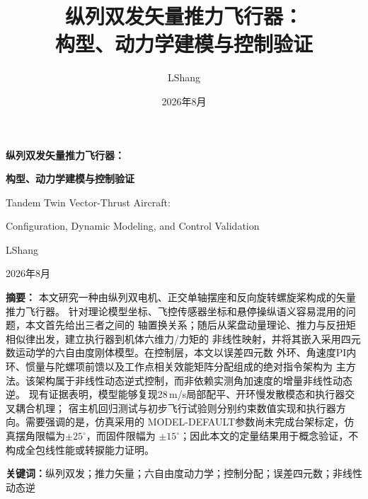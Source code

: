 


\title{\textbf{纵列双发矢量推力飞行器：\\构型、动力学建模与控制验证}}
\author{LShang}
\date{2026年8月}



\begin{titlepage}
\centering
{\bfseries 纵列双发矢量推力飞行器：\par}
\vspace{0.5em}
{\bfseries 构型、动力学建模与控制验证\par}
\vspace{1.2em}
{\Large Tandem Twin Vector-Thrust Aircraft:\par}
\vspace{0.3em}
{\Large Configuration, Dynamic Modeling, and Control Validation\par}
\vspace{1.8em}
{\large LShang\par}
\vspace{0.5em}
{\large 2026年8月\par}

\vfill
\begin{minipage}{0.92\textwidth}
\textbf{摘要：}
本文研究一种由纵列双电机、正交单轴摆座和反向旋转螺旋桨构成的矢量推力飞行器。
针对理论模型坐标、飞控传感器坐标和悬停操纵语义容易混用的问题，本文首先给出三者之间的
轴置换关系；随后从桨盘动量理论、推力与反扭矩相似律出发，建立执行器到机体六维力/力矩的
非线性映射，并将其嵌入采用四元数运动学的六自由度刚体模型。在控制层，本文以误差四元数
外环、角速度PI内环、惯量与陀螺项前馈以及工作点相关效能矩阵分配组成的绝对指令架构为
主方法。该架构属于非线性动态逆式控制，而非依赖实测角加速度的增量非线性动态逆。
现有证据表明，模型能够复现28\,m/s局部配平、开环慢发散模态和执行器交叉耦合机理；
宿主机回归测试与初步飞行试验则分别约束数值实现和执行器方向。需要强调的是，仿真采用的
MODEL-DEFAULT参数尚未完成台架标定，仿真摆角限幅为$\pm25^\circ$，而固件限幅为
$\pm15^\circ$；因此本文的定量结果用于概念验证，不构成全包线性能或转捩能力证明。

\vspace{0.6em}
\noindent\textbf{关键词：}纵列双发；推力矢量；六自由度动力学；控制分配；误差四元数；非线性动态逆


\end{minipage}
\end{titlepage}
